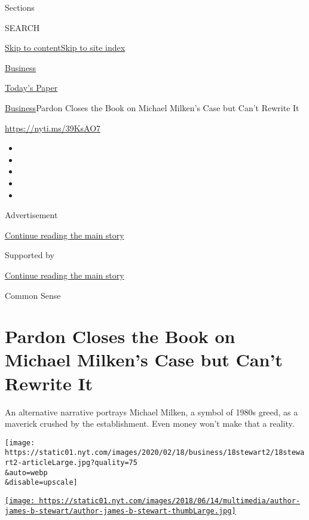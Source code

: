 Sections

SEARCH

\protect\hyperlink{site-content}{Skip to
content}\protect\hyperlink{site-index}{Skip to site index}

\href{https://www.nytimes.com/section/business}{Business}

\href{https://myaccount.nytimes.com/auth/login?response_type=cookie\&client_id=vi}{}

\href{https://www.nytimes.com/section/todayspaper}{Today's Paper}

\href{/section/business}{Business}\textbar{}Pardon Closes the Book on
Michael Milken's Case but Can't Rewrite It

\url{https://nyti.ms/39KsAO7}

\begin{itemize}
\item
\item
\item
\item
\item
\end{itemize}

Advertisement

\protect\hyperlink{after-top}{Continue reading the main story}

Supported by

\protect\hyperlink{after-sponsor}{Continue reading the main story}

Common Sense

\hypertarget{pardon-closes-the-book-on-michael-milkens-case-but-cant-rewrite-it}{%
\section{Pardon Closes the Book on Michael Milken's Case but Can't
Rewrite
It}\label{pardon-closes-the-book-on-michael-milkens-case-but-cant-rewrite-it}}

An alternative narrative portrays Michael Milken, a symbol of 1980s
greed, as a maverick crushed by the establishment. Even money won't make
that a reality.

\texttt{[image: https://static01.nyt.com/images/2020/02/18/business/18stewart2/18stewart2-articleLarge.jpg?quality=75\\\&auto=webp\\\&disable=upscale]}

\href{https://www.nytimes.com/by/james-b-stewart}{\texttt{[image: https://static01.nyt.com/images/2018/06/14/multimedia/author-james-b-stewart/author-james-b-stewart-thumbLarge.jpg]}}

